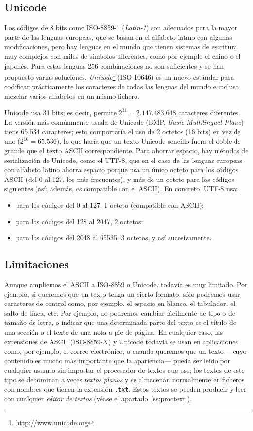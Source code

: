 \subsection{Unicode} Los códigos de 8 bits como ISO-8859-1 (\emph{Latin-1}) son adecuados para la mayor parte de las lenguas europeas, que se basan en el alfabeto latino con algunas modificaciones, pero hay lenguas en el mundo que tienen sistemas de escritura muy complejos con miles de símbolos diferentes, como por ejemplo el chino o el japonés. Para estas lenguas 256 combinaciones no son suficientes y se  han propuesto varias soluciones. \emph{Unicode}\footnote{\url{http://www.unicode.org}} (ISO 10646) es un nuevo estándar para codificar prácticamente los caracteres de todas las lenguas del mundo e incluso mezclar varios alfabetos en un mismo fichero. 

Unicode usa 31 bits; es decir, permite $2^{31}=2.147.483.648$ caracteres diferentes. La versión más comúnmente usada de Unicode (BMP, \emph{Basic Multilingual Plane}) tiene 65.534 caracteres; esto comportaría el uso de 2 octetos (16 bits) en vez de uno ($2^{16}=65.536$), lo que haría que un texto Unicode sencillo fuera el doble de grande que el texto ASCII correspondiente. Para ahorrar espacio, hay métodos de serialización de Unicode, como el UTF-8, que en el caso de las lenguas europeas con alfabeto latino ahorra espacio porque usa un único octeto para los códigos ASCII (del 0 al 127, los más frecuentes), y más de un octeto para los códigos siguientes (así, además, es compatible con el ASCII). En concreto, UTF-8 usa: \begin{itemize} \item para los códigos del 0 al 127, 1 octeto (compatible con ASCII); \item para los códigos del 128 al 2047, 2 octetos; \item para los códigos del 2048 al 65535, 3 octetos, y así sucesivamente. \end{itemize} 

\subsection{Limitaciones} 

Aunque ampliemos el ASCII a ISO-8859 o Unicode, todavía es muy limitado. Por ejemplo, si queremos que un texto tenga un cierto formato, sólo podremos usar caracteres de control como, por ejemplo, el espacio en blanco, el tabulador, el salto de línea, etc. Por ejemplo, no podremos cambiar fácilmente de tipo o de tamaño de letra, o indicar que una determinada parte del texto es el título de una sección o el texto de una nota a pie de página. En cualquier caso, las extensiones de ASCII (ISO-8859-$X$) y Unicode todavía se usan en aplicaciones como, por ejemplo, el correo electrónico, o cuando queremos que un texto ---cuyo contenido es mucho más importante que la apariencia--- pueda ser leído por cualquier usuario sin importar el procesador de textos que use; los textos de este tipo se denominan a veces \emph{textos planos} y se almacenan normalmente en ficheros con nombres que tienen la extensión \texttt{.txt}. Estos textos se pueden producir y leer con cualquier \emph{editor de textos} (véase el apartado~\ref{ss:proctext}). 

